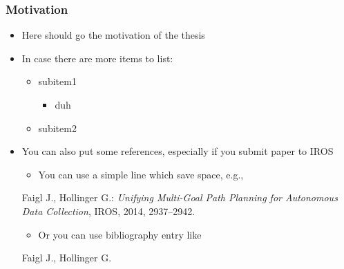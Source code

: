 
\begin{frame}
   \frametitle{Motivation}
   \begin{itemize} \justifying %
      \item Here should go the motivation of the thesis
      \item In case there are more items to list:
	   \begin{itemize} \justifying
         \item subitem1
	      \begin{itemize}
            \item duh
         \end{itemize}
	      \item subitem2
	   \end{itemize}
   \end{itemize}
   
   \begin{itemize}
      \item You can also put some references, especially if you submit paper to IROS

   \begin{itemize}
      \item You can use a simple line which save space, e.g., 
   \end{itemize}
\hspace*{0.5em}
\parbox{\textwidth}{\tiny {\color{ctu4blue}Faigl J., Hollinger G.}: \textit{Unifying Multi-Goal Path Planning for Autonomous Data Collection}, {\color{ctu4blue}IROS}, 2014, 2937--2942.}
   \begin{itemize}
      \item Or you can use bibliography entry like 
   \end{itemize}
   {\scriptsize
      \begin{thebibliography}{1c}
	    {Faigl J., Hollinger G.}
      \end{thebibliography}
   }
   \end{itemize}
\end{frame}

